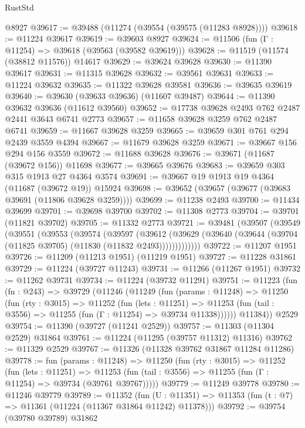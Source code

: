 \begin{lexlean}{RustStd}
\begin{coremodule}
    @8927
@39617 := @39488 (@11274 (@39554 (@39575 (@11283 @8928))))
@39618 := @11224 @39617
@39619 := @39603 @8927
@39624 := @11506 (fun (Γ : @11254) => @39618 (@39563 (@39582 @39619)))
@39628 := @11519 (@11574 (@38812 @11576)) @14617
@39629 := @39624 @39628
@39630 := @11390 @39617
@39631 := @11315 @39628
@39632 := @39561 @39631
@39633 := @11224 @39632
@39635 := @11322 @39628 @39581
@39636 := @39635 @39619
@39640 := @39630 (@39633 @39636) (@11607 @39487)
@39644 := @11390 @39632 @39636 (@11612 @39560)
@39652 := @17738 @39628 @2493 @762 @2487 @2441 @3643 @6741 @2773
@39657 := @11658 @39628 @3259 @762 @2487 @6741
@39659 := @11667 @39628 @3259
@39665 := @39659 @301 @761 @294 @2439 @3559 @4394
@39667 := @11679 @39628 @3259
@39671 := @39667 @156 @294 @156 @3559
@39672 := @11688 @39628
@39676 := @39671 (@11687 (@39672 @156)) @11698
@39677 := @39665 @39676
@39683 := @39659 @303 @315 @1913 @27 @4364 @3574
@39691 := @39667 @19 @1913 @19 @4364 (@11687 (@39672 @19)) @15924
@39698 := @39652 (@39657 (@39677 (@39683 @39691 (@11806 @39628 @3259))))
@39699 := @11238 @2493
@39700 := @11434 @39699
@39701 := @39698 @39700
@39702 := @11308 @2773
@39704 := @39701 (@11821 @39702)
@39705 := @11332 @2773
@39721 := @39481
    (@39507
      (@39549
        (@39551
          (@39553
            (@39574
              (@39597
                (@39612
                  (@39629 (@39640 (@39644 (@39704 (@11825 @39705) (@11830 (@11832 @2493)))))))))))))
@39722 := @11207 @1951
@39726 := @11209 (@11213 @1951) (@11219 @1951)
@39727 := @11228 @31861
@39729 := @11224 (@39727 @11243)
@39731 := @11266 (@11267 @1951)
@39732 := @11262 @39731
@39734 := @11224 (@39732 @11291)
@39751 := @11223
    (fun (fn : @243) =>
    @39729
      (@11246
        (@11249
          (fun (params : @11248) =>
          @11250
            (fun (rty : @3015) =>
            @11252
              (fun (lets : @11251) =>
              @11253 (fun (tail : @3556) => @11255 (fun (Γ : @11254) => @39734 @11338))))))
        @11384))
    @2529
@39754 := @11390 (@39727 (@11241 @2529))
@39757 := @11303 (@11304 @2529) @31864
@39761 := @11224 (@11295 (@39757 @11312) @11316)
@39762 := @11329 @2529
@39767 := @11326 (@11328 @39762 @31867 @11284 @11286)
@39778 := fun (params : @11248) =>
  @11250
    (fun (rty : @3015) =>
    @11252
      (fun (lets : @11251) =>
      @11253 (fun (tail : @3556) => @11255 (fun (Γ : @11254) => @39734 (@39761 @39767)))))
@39779 := @11249 @39778
@39780 := @11246 @39779
@39789 := @11352
    (fun (U : @11351) => @11353 (fun (t : @7) => @11361 (@11224 (@11367 @31864 @11242) @11378)))
@39792 := @39754 (@39780 @39789) @31862

\end{coremodule}
\end{lexlean}
